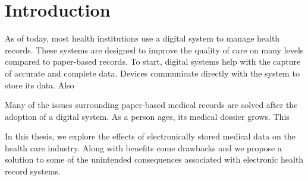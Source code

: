 \section{Introduction}

As of today, most health institutions use a digital system to manage health records. These systems are designed to improve the quality of care on many levels compared to paper-based records. To start, digital systems help with the capture of accurate and complete data. Devices communicate directly with the system to store its data. Also

Many of the issues surrounding paper-based medical records are solved after the adoption of a digital system. As a person ages, its medical dossier grows. This 

In this thesis, we explore the effects of electronically stored medical data on the health care industry. Along with benefits come drawbacks and we propose a solution to some of the unintended consequences associated with electronic health record systems.



